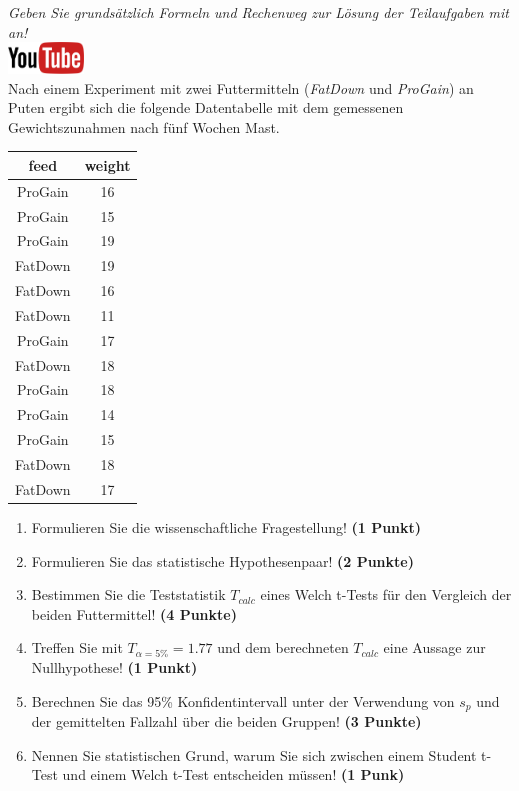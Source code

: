 \documentclass[a4paper, 10pt]{scrartcl}\usepackage[]{graphicx}\usepackage[]{xcolor}
\begin{document}
\textit{Geben Sie grunds{\"a}tzlich Formeln und Rechenweg zur L{\"o}sung der
  Teilaufgaben mit an!} \\[1Ex]

\hfill\href{https://youtu.be/TbSEOMCQYl4}{\includegraphics[width =
  2cm]{img/youtube}}\\[1Ex]

Nach einem Experiment mit zwei Futtermitteln (\textit{FatDown} und
\textit{ProGain}) an Puten ergibt sich die folgende Datentabelle mit dem gemessenen
Gewichtszunahmen nach f{\"u}nf Wochen Mast.

\begin{table}[!h]
\centering
\begin{tabular}{cc}
\toprule
feed & weight\\
\midrule
ProGain & 16\\
ProGain & 15\\
ProGain & 19\\
FatDown & 19\\
FatDown & 16\\
\addlinespace
FatDown & 11\\
ProGain & 17\\
FatDown & 18\\
ProGain & 18\\
ProGain & 14\\
\addlinespace
ProGain & 15\\
FatDown & 18\\
FatDown & 17\\
\bottomrule
\end{tabular}
\end{table}



\begin{enumerate}
  \item Formulieren Sie die wissenschaftliche Fragestellung! \textbf{(1 Punkt)}
  \item Formulieren Sie das statistische Hypothesenpaar! \textbf{(2
      Punkte)}
  \item Bestimmen Sie die Teststatistik $T_{calc}$ eines Welch t-Tests f{\"u}r den
  Vergleich der beiden Futtermittel! \textbf{(4 Punkte)}
\item Treffen Sie mit $T_{\alpha = 5\%} = 1.77$ und dem berechneten $T_{calc}$ eine Aussage
  zur Nullhypothese! \textbf{(1 Punkt)}
\item Berechnen Sie das 95\% Konfidentintervall unter der
  Verwendung von $s_p$ und der gemittelten Fallzahl {\"u}ber die beiden Gruppen! \textbf{(3 Punkte)}
\item Nennen Sie statistischen Grund, warum Sie sich zwischen einem Student t-Test und einem
  Welch t-Test entscheiden m{\"u}ssen! \textbf{(1 Punk)}
\end{enumerate} 
\clearpage
\end{document}
